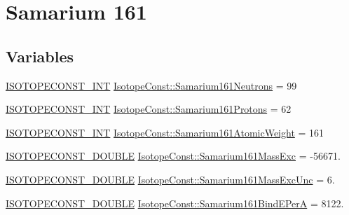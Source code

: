 \hypertarget{group___isotope_const-_samarium-_sm161}{}\section{Samarium 161}
\label{group___isotope_const-_samarium-_sm161}
\subsection*{Variables}
\begin{DoxyCompactItemize}
\item 
\mbox{\hyperlink{group___isotope_const-_macros_ga5f18360b3e99483a35c32d789e62621c}{I\+S\+O\+T\+O\+P\+E\+C\+O\+N\+S\+T\+\_\+\+I\+NT}} \mbox{\hyperlink{group___isotope_const-_samarium-_sm161_ga9317ea135b1522310bd652e60e09d0ab}{Isotope\+Const\+::\+Samarium161\+Neutrons}} = 99
\item 
\mbox{\hyperlink{group___isotope_const-_macros_ga5f18360b3e99483a35c32d789e62621c}{I\+S\+O\+T\+O\+P\+E\+C\+O\+N\+S\+T\+\_\+\+I\+NT}} \mbox{\hyperlink{group___isotope_const-_samarium-_sm161_gad08882b0957d424d8e2262c8c03c4dd8}{Isotope\+Const\+::\+Samarium161\+Protons}} = 62
\item 
\mbox{\hyperlink{group___isotope_const-_macros_ga5f18360b3e99483a35c32d789e62621c}{I\+S\+O\+T\+O\+P\+E\+C\+O\+N\+S\+T\+\_\+\+I\+NT}} \mbox{\hyperlink{group___isotope_const-_samarium-_sm161_gac04359f37823f4c6ca360ee98ddab546}{Isotope\+Const\+::\+Samarium161\+Atomic\+Weight}} = 161
\item 
\mbox{\hyperlink{group___isotope_const-_macros_ga8f45a7272ce02c0b4c65c44636ed719a}{I\+S\+O\+T\+O\+P\+E\+C\+O\+N\+S\+T\+\_\+\+D\+O\+U\+B\+LE}} \mbox{\hyperlink{group___isotope_const-_samarium-_sm161_gac309877c0df803279b41618b68e06bb4}{Isotope\+Const\+::\+Samarium161\+Mass\+Exc}} = -\/56671.
\item 
\mbox{\hyperlink{group___isotope_const-_macros_ga8f45a7272ce02c0b4c65c44636ed719a}{I\+S\+O\+T\+O\+P\+E\+C\+O\+N\+S\+T\+\_\+\+D\+O\+U\+B\+LE}} \mbox{\hyperlink{group___isotope_const-_samarium-_sm161_ga17ae8018d634463c8ee5ebf89263de36}{Isotope\+Const\+::\+Samarium161\+Mass\+Exc\+Unc}} = 6.
\item 
\mbox{\hyperlink{group___isotope_const-_macros_ga8f45a7272ce02c0b4c65c44636ed719a}{I\+S\+O\+T\+O\+P\+E\+C\+O\+N\+S\+T\+\_\+\+D\+O\+U\+B\+LE}} \mbox{\hyperlink{group___isotope_const-_samarium-_sm161_gaea85b34e8053536042b2a9f784a91422}{Isotope\+Const\+::\+Samarium161\+Bind\+E\+PerA}} = 8122.
\item 

\end{DoxyCompactItemize}
